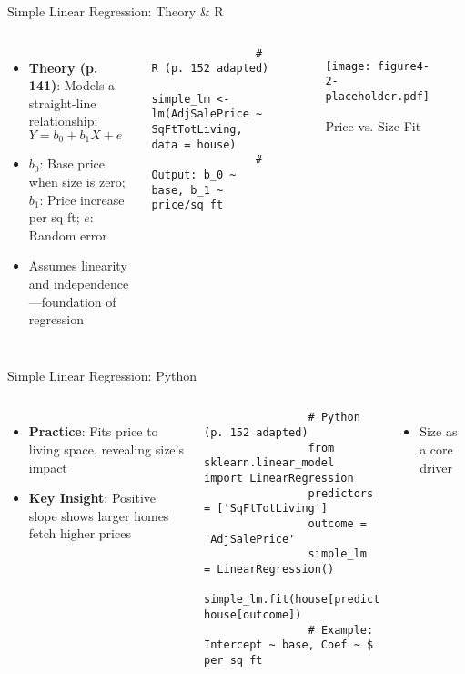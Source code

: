 \documentclass{beamer}
\begin{document}
	\begin{frame}[fragile]{Simple Linear Regression: Theory \& R}
		\begin{columns}
			\begin{itemize}
				\item \textbf{Theory (p. 141)}: Models a straight-line relationship: $Y = b_0 + b_1X + e$
				\item $b_0$: Base price when size is zero; $b_1$: Price increase per sq ft; $e$: Random error
				\item Assumes linearity and independence—foundation of regression
			\end{itemize}
			\begin{lstlisting}
				# R (p. 152 adapted)
				simple_lm <- lm(AdjSalePrice ~ SqFtTotLiving, data = house)
				# Output: b_0 ~ base, b_1 ~ price/sq ft
			\end{lstlisting}
			\begin{figure}
				\texttt{[image: figure4-2-placeholder.pdf]}
				\caption{Price vs. Size Fit}
			\end{figure}
		\end{columns}
	\end{frame}
	
	\begin{frame}[fragile]{Simple Linear Regression: Python}
		\lstset{language=Python}
		\begin{columns}
			\column{0.6\textwidth}
			\begin{itemize}
				\item \textbf{Practice}: Fits price to living space, revealing size’s impact
				\item \textbf{Key Insight}: Positive slope shows larger homes fetch higher prices
			\end{itemize}
			\begin{lstlisting}
				# Python (p. 152 adapted)
				from sklearn.linear_model import LinearRegression
				predictors = ['SqFtTotLiving']
				outcome = 'AdjSalePrice'
				simple_lm = LinearRegression()
				simple_lm.fit(house[predictors], house[outcome])
				# Example: Intercept ~ base, Coef ~ $ per sq ft
			\end{lstlisting}
			\column{0.4\textwidth}
			\begin{itemize}
				\item Size as a core driver
			\end{itemize}
		\end{columns}
	\end{frame}
	
\end{document}
